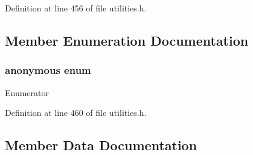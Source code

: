 Definition at line 456 of file utilities.\+h.



\subsection{Member Enumeration Documentation}
\hypertarget{structcrap_1_1limits_3_01float64__t_01_4_a62198ed37b6cdedb7b98f36546e6eea1}{}\subsubsection[{anonymous enum}]{\setlength{\rightskip}{0pt plus 5cm}anonymous enum}\label{structcrap_1_1limits_3_01float64__t_01_4_a62198ed37b6cdedb7b98f36546e6eea1}
\begin{Desc}
\item[Enumerator]\par
\begin{description}
\item[{\em 
\hypertarget{structcrap_1_1limits_3_01float64__t_01_4_a62198ed37b6cdedb7b98f36546e6eea1a151e24190e0c028ea152e1d7c724c861}{}I\+S\+\_\+\+I\+N\+T\label{structcrap_1_1limits_3_01float64__t_01_4_a62198ed37b6cdedb7b98f36546e6eea1a151e24190e0c028ea152e1d7c724c861}
}]\item[{\em 
\hypertarget{structcrap_1_1limits_3_01float64__t_01_4_a62198ed37b6cdedb7b98f36546e6eea1ab5ab79a3e54e73a297d18981af51afca}{}I\+S\+\_\+\+S\+I\+G\+N\+E\+D\label{structcrap_1_1limits_3_01float64__t_01_4_a62198ed37b6cdedb7b98f36546e6eea1ab5ab79a3e54e73a297d18981af51afca}
}]\end{description}
\end{Desc}


Definition at line 460 of file utilities.\+h.



\subsection{Member Data Documentation}
\hypertarget{structcrap_1_1limits_3_01float64__t_01_4_ac27ede6a3bbe14baeb6a1c00e51d9455}{}
